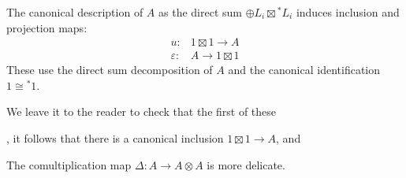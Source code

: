 \documentclass{amsart}
\begin{document}
The canonical description of $A$ as the direct sum $\oplus L_i \boxtimes {}^*L_i$ induces inclusion and projection maps:
\begin{align*}
	u: & 1 \boxtimes 1  \to A \\
	\varepsilon: & A \to 1 \boxtimes 1 
\end{align*}
These use the direct sum decomposition of $A$ and the canonical identification $1 \cong {}^*1$. 



We leave it to the reader to check that the first of these 


, it follows that there is a canonical inclusion $1 \boxtimes 1 \to A$, and  


The comultiplication map
 $\Delta: A \to A \otimes A$ is more delicate. 
\end{document}

